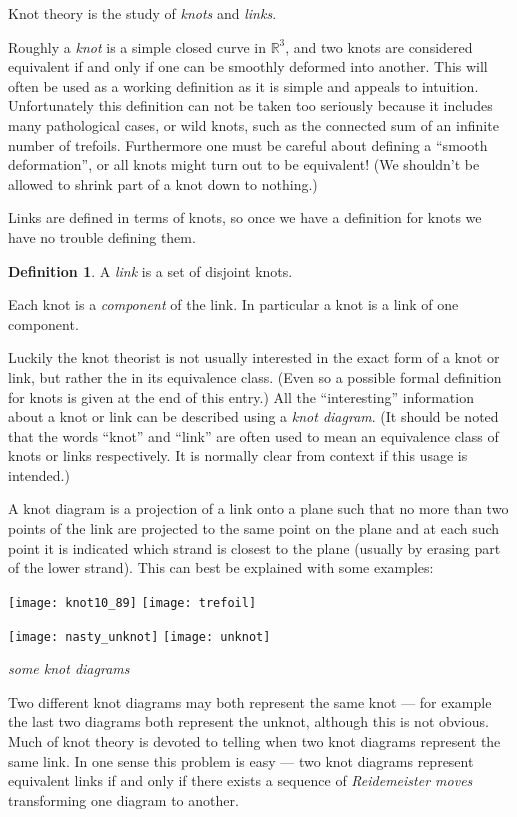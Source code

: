 \documentclass[12pt]{article}
\theoremstyle{definition}
\newtheorem*{defn}{Definition}
\begin{document}

Knot theory is the study of \emph{knots} and \emph{links}.

Roughly a \emph{knot} is a simple closed curve in $\mathbb{R}^3$, and two knots are considered equivalent if and only if one can be smoothly deformed into another. This will often be used as a working definition as it is simple and appeals to intuition. Unfortunately this definition can not be taken too seriously because it includes many pathological cases, or wild knots, such as the connected sum of an infinite number of trefoils. Furthermore one must be careful about defining a ``smooth deformation'', or all knots might turn out to be equivalent! (We shouldn't be allowed to shrink part of a knot down to nothing.)

Links are defined in terms of knots, so once we have a definition for knots we have no trouble defining them.
\begin{defn}
A \emph{link} is a set of disjoint knots.
\end{defn}
Each knot is a \emph{component} of the link. In particular a knot is a link of one component.

Luckily the knot theorist is not usually interested in the exact form of a knot or link, but rather the in its equivalence class. (Even so a possible formal definition for knots is given at the end of this entry.) All the ``interesting'' information about a knot or link can be described using a \emph{knot diagram}. (It should be noted that the words ``knot'' and ``link'' are often used to mean an equivalence class of knots or links respectively. It is normally clear from context if this usage is intended.)

A knot diagram is a projection of a link onto a plane such that no more than two points of the link are projected to the same point on the plane and at each such point it is indicated which strand is closest to the plane (usually by erasing part of the lower strand). This can best be explained with some examples:

\bigskip

\hfil \texttt{[image: knot10\_89]} \hfill
\texttt{[image: trefoil]} \hfil

\hfil \texttt{[image: nasty\_unknot]} \hfill
\texttt{[image: unknot]} \hfil

\centerline{\emph{some knot diagrams}}

\bigskip

Two different knot diagrams may both represent the same knot --- for example the last two diagrams both represent the unknot, although this is not obvious. Much of knot theory is devoted to telling when two knot diagrams represent the same link. In one sense this problem is easy --- two knot diagrams represent equivalent links if and only if there exists a sequence of \emph{Reidemeister moves} transforming one diagram to another.
\end{document}
